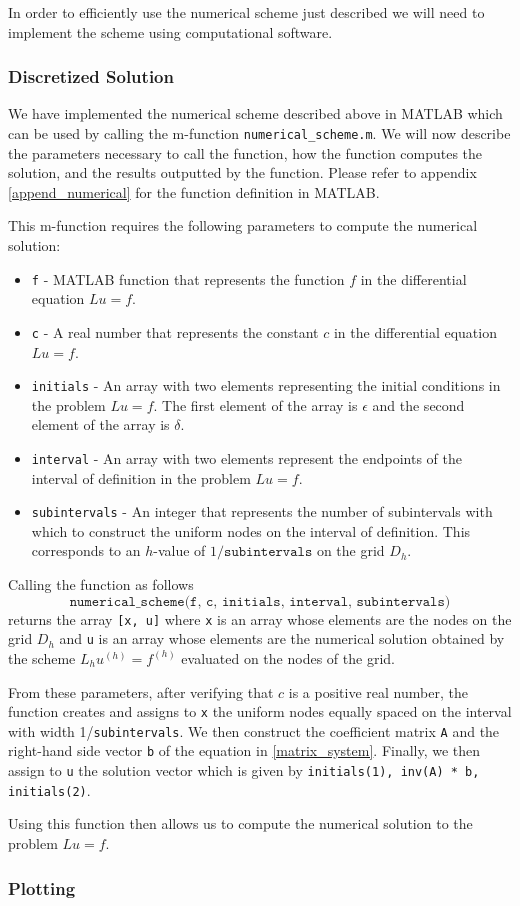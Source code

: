 In order to efficiently use the numerical scheme just described we will need to
implement the scheme using computational software.

\subsubsection{Discretized Solution}
We have implemented the numerical scheme described above in MATLAB which can be
used by calling the m-function \texttt{numerical\_scheme.m}. We will now
describe the parameters necessary to call the function, how the function
computes the solution, and the results outputted by the function. Please refer
to appendix \ref{append_numerical} for the function definition in MATLAB.

This m-function requires the following parameters to compute the numerical solution:
\begin{itemize}
  \item \texttt{f} - MATLAB function that represents the function $f$ in the differential equation $Lu = f$.
  \item \texttt{c} - A real number that represents the constant $c$ in the differential equation $Lu = f$.
  \item \texttt{initials} - An array with two elements representing the initial conditions in the problem
    $Lu=f$. The first element of the array is $\epsilon$ and the second element of the array is $\delta$.
  \item \texttt{interval} - An array with two elements represent the endpoints of the interval of definition in
    the problem $Lu = f$.
  \item \texttt{subintervals} - An integer that represents the number of subintervals with which to construct
    the uniform nodes on the interval of definition. This corresponds to an
    $h$-value of $1/\texttt{subintervals}$ on the grid $D_h$.
\end{itemize}

Calling the function as follows
\[
  \texttt{numerical\_scheme(f, c, initials, interval, subintervals)}
\]
returns the array \texttt{[x, u]} where \texttt{x} is an array whose elements are
the nodes on the grid $D_h$ and \texttt{u} is an array whose elements are the
numerical solution obtained by the scheme $L_h u^{(h)} = f^{(h)}$ evaluated on the
nodes of the grid.

From these parameters, after verifying that $c$ is a positive real number,
the function creates and assigns to \texttt{x} the uniform
nodes equally spaced on the interval with width 1/\texttt{subintervals}. We then
construct the  coefficient matrix \texttt{A} and the right-hand side vector \texttt{b} of the equation
in \eqref{matrix_system}. Finally, we then assign to \texttt{u} the solution vector
which is given by \texttt{initials(1), inv(A) * b, initials(2)}.

Using this function then allows us to compute the numerical solution to the problem
$Lu = f$.

\subsubsection{Plotting}
